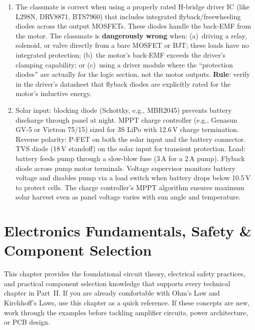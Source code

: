 \documentclass[11pt,letterpaper,twoside,openany]{book}
\begin{document}
\begin{enumerate}[leftmargin=1.5em]
  \item The classmate is correct when using a properly rated H-bridge driver IC (like L298N, DRV8871, BTS7960) that includes integrated flyback/freewheeling diodes across the output MOSFETs. These diodes handle the back-EMF from the motor. The classmate is \textbf{dangerously wrong} when: (a)~driving a relay, solenoid, or valve directly from a bare MOSFET or BJT; these loads have no integrated protection; (b)~the motor's back-EMF exceeds the driver's clamping capability; or (c)~using a driver module where the ``protection diodes'' are actually for the logic section, not the motor outputs. \textbf{Rule}: verify in the driver's datasheet that flyback diodes are explicitly rated for the motor's inductive energy.

  \item Solar input: blocking diode (Schottky, e.g., MBR2045) prevents battery discharge through panel at night. MPPT charge controller (e.g., Genasun GV-5 or Victron 75/15) sized for 3S LiPo with 12.6\,V charge termination. Reverse polarity: P-FET on both the solar input and the battery connector. TVS diode (18\,V standoff) on the solar input for transient protection. Load: battery feeds pump through a slow-blow fuse (3\,A for a 2\,A pump). Flyback diode across pump motor terminals. Voltage supervisor monitors battery voltage and disables pump via a load switch when battery drops below 10.5\,V to protect cells. The charge controller's MPPT algorithm ensures maximum solar harvest even as panel voltage varies with sun angle and temperature.
\end{enumerate}




\chapter{Electronics Fundamentals, Safety \& Component Selection}\label{ch:electronics}

\vspace{1em}

This chapter provides the foundational circuit theory, electrical safety practices, and practical component selection knowledge that supports every technical chapter in Part~II. If you are already comfortable with Ohm's Law and Kirchhoff's Laws, use this chapter as a quick reference. If these concepts are new, work through the examples before tackling amplifier circuits, power architecture, or PCB design.
\end{document}
